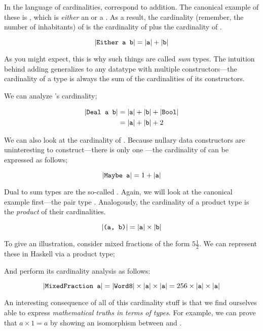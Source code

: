 \documentclass[book.tex]{subfiles}
\begin{document}
In the language of cardinalities,  correspond to
addition. The canonical example of these is , which is
\emph{either} an  or a . As a result, the cardinality (remember, the
number of inhabitants) of  is the cardinality of  plus the
cardinality of .

$$
\lvert\texttt{Either a b}\rvert = \lvert\texttt{a}\rvert + \lvert\texttt{b}\rvert
$$

As you might expect, this is why such things are called \emph{sum} types. The
intuition behind adding generalizes to any datatype with multiple
constructors---the cardinality of a type is always the sum of the cardinalities
of its constructors.


We can analyze 's cardinality;

\begin{align*}
  \lvert\texttt{Deal a b}\rvert &= \lvert\texttt{a}\rvert + \lvert\texttt{b}\rvert + \lvert\texttt{Bool}\rvert \\
  &= \lvert\texttt{a}\rvert + \lvert\texttt{b}\rvert + 2
\end{align*}

We can also look at the cardinality of . Because nullary data
constructors are uninteresting to construct---there is only one
---the cardinality of  can be expressed as follows;

$$
\lvert\texttt{Maybe a}\rvert = 1 + \lvert\texttt{a}\rvert
$$

Dual to sum types are the so-called . Again,
we will look at the canonical example first---the pair type .
Analogously, the cardinality of a product type is the \emph{product} of their
cardinalities.

$$
\lvert\texttt{(a, b)}\rvert = \lvert\texttt{a}\rvert \times \lvert\texttt{b}\rvert
$$

To give an illustration, consider mixed fractions of the form $5\frac{1}{2}$. We
can represent these in Haskell via a product type;


And perform its cardinality analysis as follows:

$$
\lvert\texttt{MixedFraction a}\rvert = \lvert\texttt{Word8}\rvert \times \lvert\texttt{a}\rvert \times \lvert\texttt{a}\rvert = 256
\times \lvert\texttt{a}\rvert \times \lvert\texttt{a}\rvert
$$

An interesting consequence of all of this cardinality stuff is that we find
ourselves able to express \emph{mathematical truths in terms of types}. For
example, we can prove that $a \times 1 = a$ by showing an isomorphism between
 and .
\end{document}
